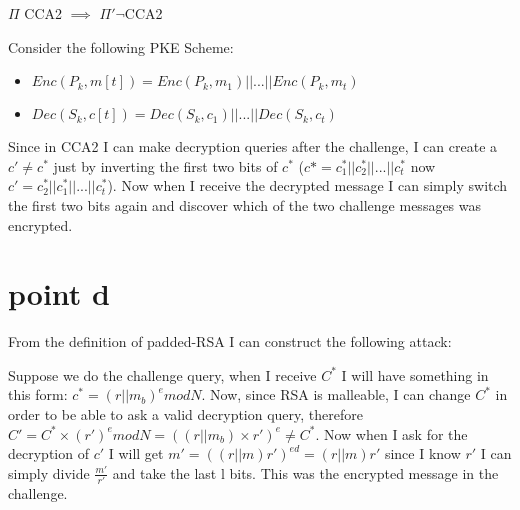 $\Pi$ CCA2 $\implies$ $\Pi' \neg$CCA2

Consider the following PKE Scheme:
\begin{itemize}
    \item $Enc(P_k,m[t])=Enc(P_k,m_1)||...||Enc(P_k,m_t)$
    \item $Dec(S_k,c[t])=Dec(S_k,c_1)||...||Dec(S_k,c_t)$
\end{itemize}
Since in CCA2 I can make decryption queries after the challenge, I can create a $c'\neq c^*$ just by inverting the first two bits of $c^*$ ($c*=c_1^*||c_2^*||...||c^*_t$ now $c'=c_2^*||c_1^*||...||c^*_t$). Now when I receive the decrypted message I can simply switch the first two bits again and discover which of the two challenge messages was encrypted.

\section{point d}

From the definition of padded-RSA I can construct the following attack:

Suppose we do the challenge query, when I receive $C^*$ I will have something in this form: $c^*=(r||m_b)^e mod N$. Now, since RSA is malleable, I can change $C^*$ in order to be able to ask a valid decryption query, therefore $C'=C^*\times(r')^e mod N= ((r||m_b) \times r')^e\neq C^*$. Now when I ask for the decryption of $c'$ I will get $m'=((r||m)r')^{ed}=(r||m)r'$ since I know $r'$ I can simply divide $\frac{m'}{r'}$ and take the last l bits. This was the encrypted message in the challenge. 